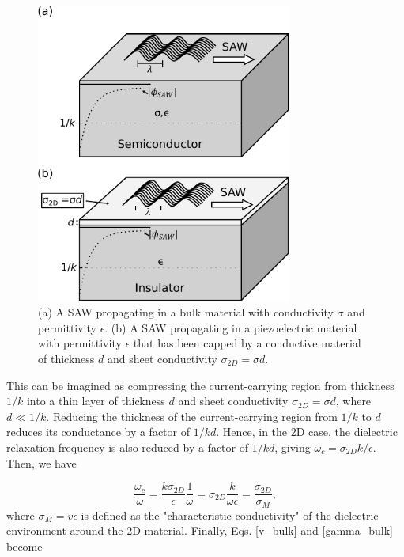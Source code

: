 \documentclass[double,12pt,1in]{beavtex}
\begin{document}
\begin{figure}
    \includegraphics[width = 0.75\textwidth]{SAW in thin film.pdf}
    \caption{(a) A SAW propagating in a bulk material with conductivity $\sigma$ and permittivity $\epsilon$. (b) A SAW propagating in a piezoelectric material with permittivity $\epsilon$ that has been capped by a conductive material of thickness $d$ and sheet conductivity $\sigma_{2D} = \sigma d$.}
    \label{SAW in thin film}
\end{figure}

This can be imagined as compressing the current-carrying region from thickness $1/k$ into a thin layer of thickness $d$ and sheet conductivity $\sigma_{2D} = \sigma d$, where $d \ll 1/k$. Reducing the thickness of the current-carrying region from $1/k$ to $d$ reduces its conductance by a factor of $1/kd$. Hence, in the 2D case, the dielectric relaxation frequency is also reduced by a factor of $1/kd$, giving $\omega_c = \sigma_{2D}k/\epsilon$. Then, we have
 
\begin{equation}
    \frac{\omega_c}{\omega} = \frac{k\sigma_{2D}}{\epsilon}\frac{1}{\omega} = \sigma_{2D}\frac{k}{\omega \epsilon} = \frac{\sigma_{2D}}{\sigma_M}, \label{omega_c div omega}
\end{equation}
where $\sigma_M = v \epsilon$ is defined as the "characteristic conductivity" of the dielectric environment around the 2D material. Finally, Eqs. \ref{v_bulk} and \ref{gamma_bulk} become
\end{document}
